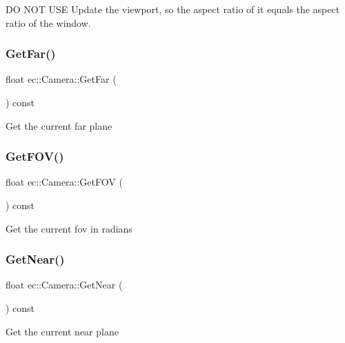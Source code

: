 DO N\+OT U\+SE Update the viewport, so the aspect ratio of it equals the aspect ratio of the window. \mbox{\label{classec_1_1_camera_a5bdbf9c5001e666bed13a5c75fd1c88f}} 
\subsubsection{\texorpdfstring{Get\+Far()}{GetFar()}}
{\footnotesize\ttfamily float ec\+::\+Camera\+::\+Get\+Far (\begin{DoxyParamCaption}{ }\end{DoxyParamCaption}) const}

Get the current far plane \mbox{\label{classec_1_1_camera_a076c35547c2e64166ac3307b13292131}} 
\subsubsection{\texorpdfstring{Get\+F\+O\+V()}{GetFOV()}}
{\footnotesize\ttfamily float ec\+::\+Camera\+::\+Get\+F\+OV (\begin{DoxyParamCaption}{ }\end{DoxyParamCaption}) const}

Get the current fov in radians \mbox{\label{classec_1_1_camera_abf0024083abfe06c0e5de606ee2b8912}} 
\subsubsection{\texorpdfstring{Get\+Near()}{GetNear()}}
{\footnotesize\ttfamily float ec\+::\+Camera\+::\+Get\+Near (\begin{DoxyParamCaption}{ }\end{DoxyParamCaption}) const}

Get the current near plane \mbox{\label{classec_1_1_camera_a9c52ad9d4077faf50d1d7170d08e1f13}} 
